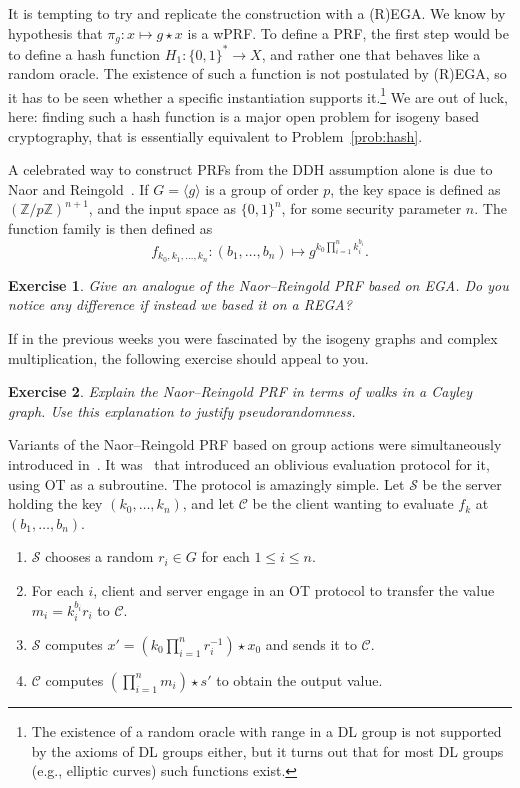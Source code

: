 \documentclass{article}
\newtheorem{ex}{Exercise}
\def\Z{\mathbb{Z}}
\begin{document}
It is tempting to try and replicate the construction with a (R)EGA.
We know by hypothesis that $\pi_g : x\mapsto g\star x$ is a wPRF.  To
define a PRF, the first step would be to define a hash function
$H_1:\{0,1\}^*\to X$, and rather one that behaves like a random
oracle.  The existence of such a function is not postulated by (R)EGA,
so it has to be seen whether a specific instantiation supports
it.\footnote{The existence of a random oracle with range in a DL group
  is not supported by the axioms of DL groups either, but it turns out
  that for most DL groups (e.g., elliptic curves) such functions
  exist.}  We are out of luck, here: finding such a hash function is a
major open problem for isogeny based cryptography, that is essentially
equivalent to Problem~\ref{prob:hash}.

A celebrated way to construct PRFs from the DDH assumption alone is
due to Naor and Reingold~\cite{FOCS:NaoRei97}.  If
$G=\langle g\rangle$ is a group of order $p$, the key space is defined
as $(\Z/p\Z)^{n+1}$, and the input space as $\{0,1\}^n$, for some
security parameter $n$.  The function family is then defined as
\[f_{k_0,k_1,\dots,k_n} : (b_1,\dots,b_n) \mapsto g^{k_0\prod_{i=1}^n k_i^{b_i}}.\] 

\begin{ex}
  Give an analogue of the Naor--Reingold PRF based on EGA.  Do you
  notice any difference if instead we based it on a REGA?
\end{ex}

If in the previous weeks you were fascinated by the isogeny graphs and
complex multiplication, the following exercise should appeal to you.

\begin{ex}
  Explain the Naor--Reingold PRF in terms of walks in a Cayley graph.
  Use this explanation to justify pseudorandomness.
\end{ex}

Variants of the Naor--Reingold PRF based on group actions were
simultaneously introduced
in~\cite{AC:ADMP20,AC:BonKogWoo20,AC:MorOnuTak20}.  It
was~\cite{AC:BonKogWoo20} that introduced an oblivious evaluation
protocol for it, using OT as a subroutine. The protocol is amazingly
simple. Let $\mathcal{S}$ be the server holding the key
$(k_0,\dots,k_{n})$, and let $\mathcal{C}$ be the client wanting to
evaluate $f_k$ at $(b_1,\dots,b_n)$.

\begin{enumerate}
\item $\mathcal{S}$ chooses a random $r_i\in G$ for each
  $1\le i \le n$.
\item For each $i$, client and server engage in an OT protocol to
  transfer the value $m_i = k_i^{b_i}r_i$ to $\mathcal{C}$.
\item $\mathcal{S}$ computes
  $x' = (k_0\prod_{i=1}^n r_i^{-1})\star x_0$ and sends it to
  $\mathcal{C}$.
\item $\mathcal{C}$ computes $(\prod_{i=1}^n m_i) \star s'$ to obtain
  the output value.
\end{enumerate}
\end{document}
